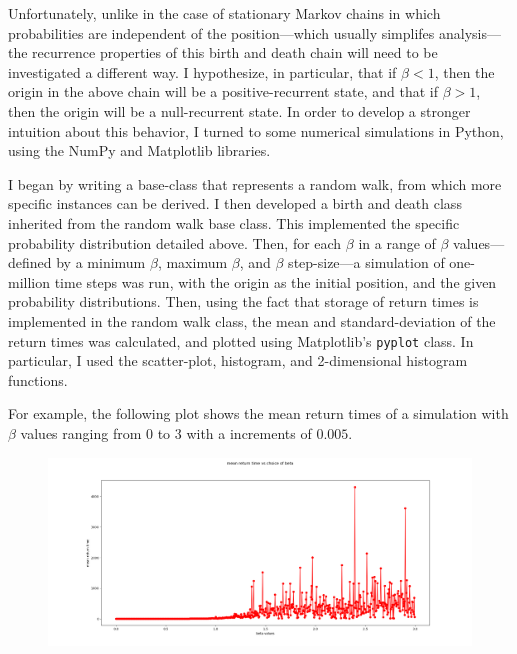 Unfortunately, unlike in the case of stationary Markov chains in which probabilities are independent of
the position---which usually simplifes analysis---the recurrence properties of this birth and death
chain will need to be investigated a different way. I hypothesize, in particular, that if $\beta < 1$,
then the origin in the above chain will be a positive-recurrent state, and that if $\beta > 1$, then the
origin will be a null-recurrent state. In order to develop a stronger intuition about this behavior, I
turned to some numerical simulations in Python, using the NumPy and Matplotlib libraries.

I began by writing a base-class that represents a random walk, from which more specific instances can be
derived. I then developed a birth and death class inherited from the random walk base class. This
implemented the specific probability distribution detailed above. Then, for each $\beta$ in a range of
$\beta$ values---defined by a minimum $\beta$, maximum $\beta$, and $\beta$ step-size---a simulation of
one-million time steps was run, with the origin as the initial position, and the given probability
distributions. Then, using the fact that storage of return times is implemented in the random walk
class, the mean and standard-deviation of the return times was calculated, and plotted using
Matplotlib's \texttt{pyplot} class. In particular, I used the scatter-plot, histogram, and 2-dimensional
histogram functions.

For example, the following plot shows the mean return times of a simulation with $\beta$ values ranging
from $0$ to $3$ with a increments of $0.005$.

\noindent
\begin{figure}[H]
    \begin{center}
        \includegraphics[width=\textwidth]{plots/returntimesplot1.png}
    \end{center}
\end{figure}

